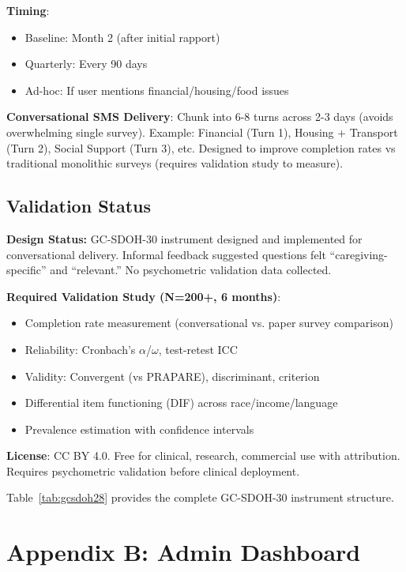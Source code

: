 \documentclass{article}
\begin{document}
\textbf{Timing}:
\begin{itemize}
    \item Baseline: Month 2 (after initial rapport)
    \item Quarterly: Every 90 days
    \item Ad-hoc: If user mentions financial/housing/food issues
\end{itemize}

\textbf{Conversational SMS Delivery}: Chunk into 6-8 turns across 2-3 days (avoids overwhelming single survey). Example: Financial (Turn 1), Housing + Transport (Turn 2), Social Support (Turn 3), etc. Designed to improve completion rates vs traditional monolithic surveys (requires validation study to measure).

\subsection*{Validation Status}

\textbf{Design Status:} GC-SDOH-30 instrument designed and implemented for conversational delivery. Informal feedback suggested questions felt ``caregiving-specific'' and ``relevant.'' No psychometric validation data collected.

\textbf{Required Validation Study (N=200+, 6 months)}:
\begin{itemize}
    \item Completion rate measurement (conversational vs. paper survey comparison)
    \item Reliability: Cronbach's $\alpha$/$\omega$, test-retest ICC
    \item Validity: Convergent (vs PRAPARE), discriminant, criterion
    \item Differential item functioning (DIF) across race/income/language
    \item Prevalence estimation with confidence intervals
\end{itemize}

\textbf{License}: CC BY 4.0. Free for clinical, research, commercial use with attribution. Requires psychometric validation before clinical deployment.

Table~\ref{tab:gcsdoh28} provides the complete GC-SDOH-30 instrument structure.

%

%
\section*{Appendix B: Admin Dashboard}
\end{document}
